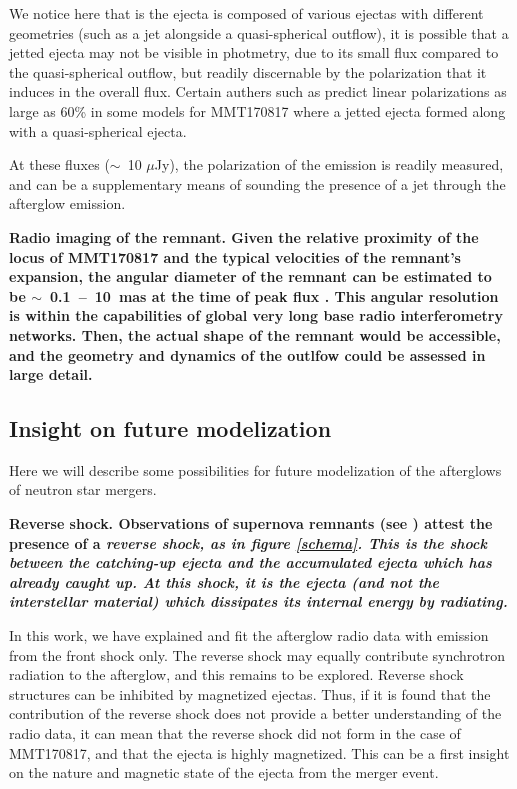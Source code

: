 We notice here that is the ejecta is composed of various ejectas with different geometries (such as a jet alongside a quasi-spherical outflow), it is possible that a jetted ejecta may not be visible in photmetry, due to its small flux compared to the quasi-spherical outflow, but readily discernable by the polarization that it induces in the overall flux. Certain authers such as \cite{7} predict linear polarizations as large as 60\% in some models for MMT170817 where a jetted ejecta formed along with a quasi-spherical ejecta.

At these fluxes ($\sim$~10 $\mu$Jy), the polarization of the emission is readily measured, and can be a supplementary means of sounding the presence of a jet through the afterglow emission.

\bf{Radio imaging of the remnant.} Given the relative proximity of the locus of MMT170817 and the typical velocities of the remnant's expansion, the angular diameter of the remnant can be estimated to be $\sim$~0.1~--~10~mas at the time of peak flux \cite{7}. This angular resolution is within the capabilities of global very long base radio interferometry networks. Then, the actual shape of the remnant would be accessible, and the geometry and dynamics of the outlfow could be assessed in large detail.

\subsection{Insight on future modelization}

Here we will describe some possibilities for future modelization of the afterglows of neutron star mergers.

\bf{Reverse shock.} Observations of supernova remnants (see \cite{56}) attest the presence of a \it{reverse shock}, as in figure \ref{schema}. This is the shock between the catching-up ejecta and the accumulated ejecta which has already caught up. At this shock, it is the ejecta (and not the interstellar material) which dissipates its internal energy by radiating.

In this work, we have explained and fit the afterglow radio data with emission from the front shock only. The reverse shock may equally contribute synchrotron radiation to the afterglow, and this remains to be explored. Reverse shock structures can be inhibited by magnetized ejectas. Thus, if it is found that the contribution of the reverse shock does not provide a better understanding of the radio data, it can mean that the reverse shock did not form in the case of MMT170817, and that the ejecta is highly magnetized. This can be a first insight on the nature and magnetic state of the ejecta from the merger event.


